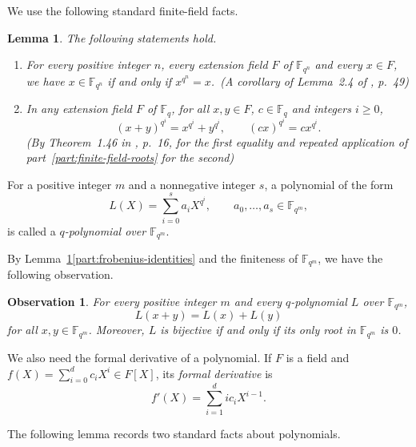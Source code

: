 \documentclass[12pt]{article}
\numberwithin{equation}{section}
\newtheorem{lemma}[theorem]{Lemma}
\newtheorem{observation}[theorem]{Observation}
\theoremstyle{definition}
\newcommand{\F}{\mathbb F}
\begin{document}
We use the following standard finite-field facts.

\begin{lemma}\label{lem:finite-field-facts}
The following statements hold.
\begin{enumerate}[label=\textup{(\arabic*)},ref=(\arabic*)]
\item\label{part:finite-field-roots}
For every positive integer $n$, every extension field $F$ of $\F_{q^n}$ and every $x\in F$, we have $x\in\F_{q^n}$ if and only if $x^{q^n}=x$.~\textup{(A corollary of Lemma~2.4 of \cite{LidlNiederreiter1997}, p.~49)}
\item\label{part:frobenius-identities}
In any extension field $F$ of $\F_q$, for all $x,y\in F$, $c\in\F_q$ and integers $i\ge0$,
\[
 (x+y)^{q^i}=x^{q^i}+y^{q^i},
 \qquad
 (cx)^{q^i}=c x^{q^i}.
\]
\textup{(By Theorem~1.46 in \cite{LidlNiederreiter1997}, p.~16, for the first equality and repeated application of part~\ref{part:finite-field-roots} for the second)}
\end{enumerate}
\end{lemma}

%
For a positive integer $m$ and a nonnegative integer $s$, a polynomial of the form
\[
        L(X)=\sum_{i=0}^{s}a_iX^{q^i},
        \qquad a_0,\ldots,a_s\in\F_{q^m},
\]
is called a \emph{$q$-polynomial over $\F_{q^m}$}.

By Lemma~\ref{lem:finite-field-facts}\ref{part:frobenius-identities} and the finiteness of $\F_{q^m}$, we have the following observation.

\begin{observation}\label{obs:q-polynomial-properties}
For every positive integer $m$ and every $q$-polynomial $L$ over $\F_{q^m}$,
\[
        L(x+y)=L(x)+L(y)
\]
for all $x,y\in\F_{q^m}$. Moreover, $L$ is bijective if and only if its only root in $\F_{q^m}$ is $0$.
\end{observation}

We also need the formal derivative of a polynomial. If $F$ is a field and
$f(X)=\sum_{i=0}^{d}c_i X^i\in F[X]$, its \emph{formal derivative} is
\[
        f'(X)=\sum_{i=1}^{d}i c_i X^{i-1}.
\]

The following lemma records two standard facts about polynomials.
\end{document}
